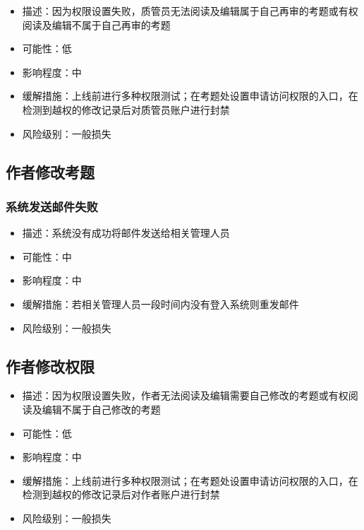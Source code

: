 \documentclass[hyperref, a4paper]{ctexart}
\providecommand{\tightlist}{%
  \setlength{\itemsep}{0pt}\setlength{\parskip}{0pt}}
\begin{document}
\begin{itemize}
\tightlist
\item
  描述：因为权限设置失败，质管员无法阅读及编辑属于自己再审的考题或有权阅读及编辑不属于自己再审的考题
\item
  可能性：低
\item
  影响程度：中
\item
  缓解措施：上线前进行多种权限测试；在考题处设置申请访问权限的入口，在检测到越权的修改记录后对质管员账户进行封禁
\item
  风险级别：一般损失
\end{itemize}

\hypertarget{ux4f5cux8005ux4feeux6539ux8003ux9898-1}{%
\subsection{作者修改考题}\label{ux4f5cux8005ux4feeux6539ux8003ux9898-1}}

\hypertarget{ux7cfbux7edfux53d1ux9001ux90aeux4ef6ux5931ux8d25-4}{%
\subsubsection{系统发送邮件失败}\label{ux7cfbux7edfux53d1ux9001ux90aeux4ef6ux5931ux8d25-4}}

\begin{itemize}
\tightlist
\item
  描述：系统没有成功将邮件发送给相关管理人员
\item
  可能性：中
\item
  影响程度：中
\item
  缓解措施：若相关管理人员一段时间内没有登入系统则重发邮件
\item
  风险级别：一般损失
\end{itemize}

\hypertarget{ux4f5cux8005ux4feeux6539ux6743ux9650-1}{%
\subsection{作者修改权限}\label{ux4f5cux8005ux4feeux6539ux6743ux9650-1}}

\begin{itemize}
\tightlist
\item
  描述：因为权限设置失败，作者无法阅读及编辑需要自己修改的考题或有权阅读及编辑不属于自己修改的考题
\item
  可能性：低
\item
  影响程度：中
\item
  缓解措施：上线前进行多种权限测试；在考题处设置申请访问权限的入口，在检测到越权的修改记录后对作者账户进行封禁
\item
  风险级别：一般损失
\end{itemize}
\end{document}
